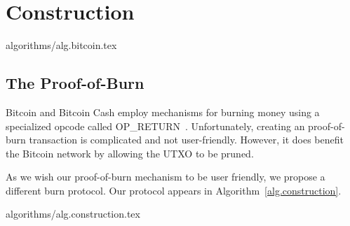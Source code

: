 \section{Construction}\label{section:construction}

{algorithms/alg.bitcoin.tex}


\subsection{The Proof-of-Burn}
Bitcoin and Bitcoin Cash employ mechanisms for burning money using a specialized
opcode called \textsf{OP\_RETURN}~\cite{bartoletti2017analysis}. Unfortunately,
creating an  proof-of-burn transaction is complicated and not
user-friendly. However, it does benefit the Bitcoin network by allowing the UTXO
to be pruned.

As we wish our proof-of-burn mechanism to be user friendly, we propose a
different burn protocol. Our protocol appears in
Algorithm~\ref{alg.construction}.

{algorithms/alg.construction.tex}
